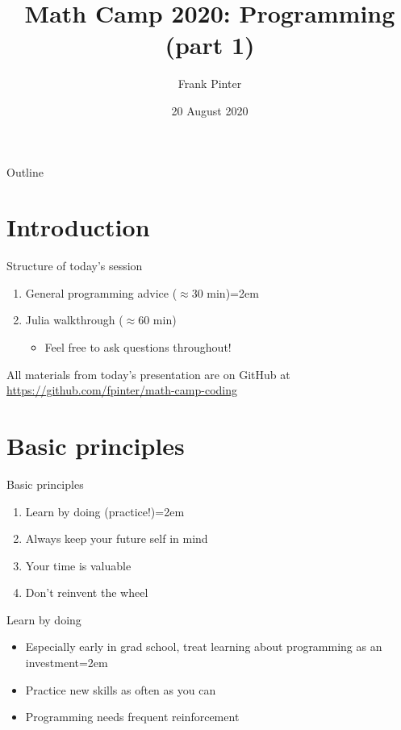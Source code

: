\documentclass[handout]{beamer}
\title{Math Camp 2020: Programming (part 1)}
\author{Frank Pinter}
\date{20 August 2020}
\begin{document}
\begin{frame}
  \titlepage
\end{frame}

\begin{frame}{Outline}
  \tableofcontents
\end{frame}

\section*{Introduction}

\begin{frame}{Structure of today's session}
\begin{enumerate}
    \item General programming advice ($\approx 30$ min)\itemsep=2em
    \item Julia walkthrough ($\approx 60$ min)
    \begin{itemize}
        \item Feel free to ask questions throughout!
    \end{itemize}
\end{enumerate}
\vspace{0.5in}
All materials from today's presentation are on GitHub at \\
\url{https://github.com/fpinter/math-camp-coding}
\end{frame}

\section{Basic principles}

\begin{frame}{Basic principles}
    \begin{enumerate}
        \item Learn by doing (practice!)\itemsep=2em
        \item Always keep your future self in mind
        \item Your time is valuable
        \item Don't reinvent the wheel
    \end{enumerate}
\end{frame}

\begin{frame}{Learn by doing}
    \begin{itemize}
        \item Especially early in grad school, treat learning about programming as an investment\itemsep=2em
        \item Practice new skills as often as you can
        \item Programming needs frequent reinforcement
    \end{itemize}
\end{frame}
\end{document}
